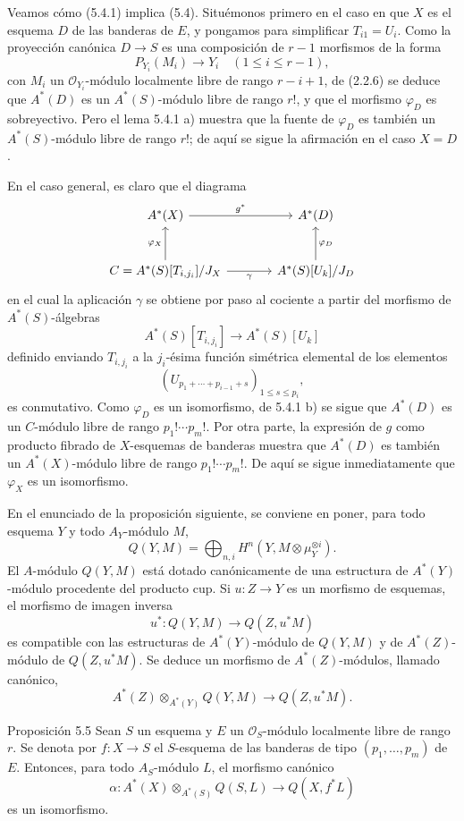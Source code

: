 Veamos cómo (5.4.1) implica (5.4). Situémonos primero en el caso en que $X$ es el esquema $D$ de las banderas de $E$, y pongamos para simplificar $T_{i1}=U_i$. Como la proyección canónica $D\to S$ es una composición de $r-1$ morfismos de la forma
\[
P_{Y_i}(M_i)\to Y_i\quad(1\le i\le r-1),
\]
con $M_i$ un $\mathcal O_{Y_i}$-módulo localmente libre de rango $r-i+1$, de (2.2.6) se deduce que $A^*(D)$ es un $A^*(S)$-módulo libre de rango $r!$, y que el morfismo $\varphi_D$ es sobreyectivo. Pero el lema 5.4.1 a) muestra que la fuente de $\varphi_D$ es también un $A^*(S)$-módulo libre de rango $r!$; de aquí se sigue la afirmación en el caso $X=D$.

En el caso general, es claro que el diagrama
\[
\begin{tikzcd}[column sep=large,row sep=large]
A^*(X) \arrow[r,"g^*"] & A^*(D)\\
C=A^*(S)[T_{i,j_i}]/J_X \arrow[u,"\varphi_X"] \arrow[r,"\gamma"'] &
A^*(S)[U_k]/J_D \arrow[u,"\varphi_D"']
\end{tikzcd}
\]
en el cual la aplicación $\gamma$ se obtiene por paso al cociente a partir del morfismo de $A^*(S)$-álgebras
\[
A^*(S)[T_{i,j_i}]\to A^*(S)[U_k]
\]
definido enviando $T_{i,j_i}$ a la $j_i$-ésima función simétrica elemental de los elementos
\[
(U_{p_1+\cdots+p_{i-1}+s})_{1\le s\le p_i},
\]
es conmutativo. Como $\varphi_D$ es un isomorfismo, de 5.4.1 b) se sigue que $A^*(D)$ es un $C$-módulo libre de rango $p_1!\cdots p_m!$. Por otra parte, la expresión de $g$ como producto fibrado de $X$-esquemas de banderas muestra que $A^*(D)$ es también un $A^*(X)$-módulo libre de rango $p_1!\cdots p_m!$. De aquí se sigue inmediatamente que $\varphi_X$ es un isomorfismo.

En el enunciado de la proposición siguiente, se conviene en poner, para todo esquema $Y$ y todo $A_Y$-módulo $M$,
\[
Q(Y,M)=\bigoplus_{n,i}H^n(Y,M\otimes\mu_Y^{\otimes i}).
\]
El $A$-módulo $Q(Y,M)$ está dotado canónicamente de una estructura de $A^*(Y)$-módulo procedente del producto cup. Si $u:Z\to Y$ es un morfismo de esquemas, el morfismo de imagen inversa
\[
u^*:Q(Y,M)\to Q(Z,u^*M)
\]
es compatible con las estructuras de $A^*(Y)$-módulo de $Q(Y,M)$ y de $A^*(Z)$-módulo de $Q(Z,u^*M)$. Se deduce un morfismo de $A^*(Z)$-módulos, llamado canónico,
\[
A^*(Z)\otimes_{A^*(Y)}Q(Y,M)\to Q(Z,u^*M).
\]

\begin{statement}{Proposición 5.5}
Sean $S$ un esquema y $E$ un $\mathcal O_S$-módulo localmente libre de rango $r$. Se denota por $f:X\to S$ el $S$-esquema de las banderas de tipo $(p_1,\ldots,p_m)$ de $E$. Entonces, para todo $A_S$-módulo $L$, el morfismo canónico
\[
\alpha:A^*(X)\otimes_{A^*(S)}Q(S,L)\to Q(X,f^*L)
\]
es un isomorfismo.
\end{statement}

